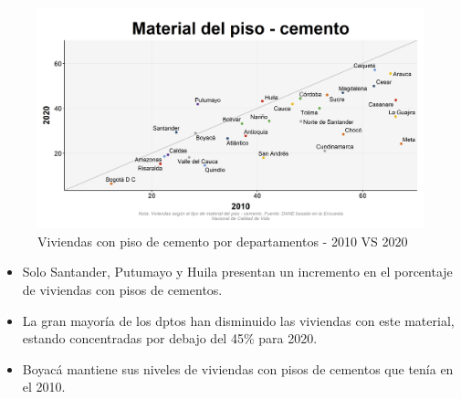     \begin{figure}[H]
        \caption{Viviendas con piso de cemento por departamentos - 2010 VS 2020 \label{map_result_2} }
        \begin{center}
        \includegraphics[width=\textwidth,keepaspectratio]{img/var_177_scatter_time.png}
        \end{center}
    \end{figure}
            \begin{itemize}
                    \item Solo Santander, Putumayo y Huila presentan un incremento en el porcentaje de viviendas con pisos de cementos.
                    \item La gran mayoría de los dptos han disminuido las viviendas con este material, estando concentradas por debajo del 45\% para 2020.
                    \item Boyacá mantiene sus niveles de viviendas con pisos de cementos que tenía en el 2010.
                    \end{itemize}

